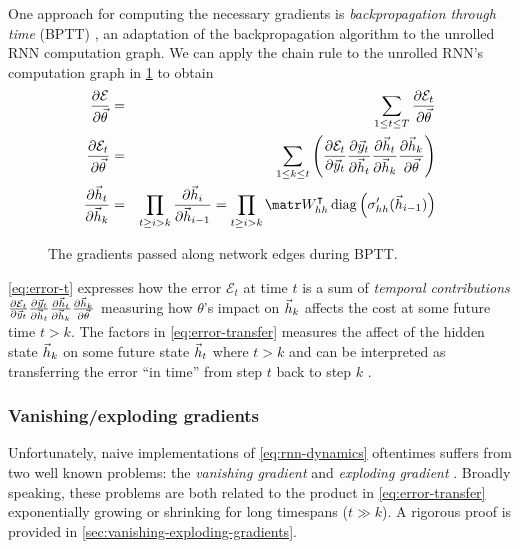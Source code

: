 One approach for computing the necessary gradients is \emph{backpropagation
through time} (BPTT) \citep{goller1996learning}, an adaptation of the backpropagation
algorithm \citep{linnainmaa1970representation,rumelhart1988learning} to the unrolled RNN computation
graph. We can apply the chain rule to the unrolled RNN's computation graph in
\cref{fig:rnn-bptt} to obtain
\begin{align}
    \frac{\pd \mathcal{E}}{\pd \vec{\theta}} &=& \sum_{1 \leq t \leq T} \frac{\pd \mathcal{E}_t}{\pd \vec{\theta}} \\
    \frac{\pd \mathcal{E}_t}{\pd \vec{\theta}} &=& \sum_{1 \leq k \leq t} \left(
        \frac{\pd \mathcal{E}_t}{\pd \y_t}
        \frac{\pd \y_t}{\pd \h_t}
        \frac{\pd \h_t}{\pd \h_k}
        \frac{\pd \h_k}{\pd \vec{\theta}}
    \right) \label{eq:error-t}\\
    \frac{\pd \h_t}{\pd \h_k} &=&
    \prod_{t \geq i > k} \frac{\pd \h_i}{\pd \h_{i-1}}
    = \prod_{t \geq i > k} \W_{hh}^\tp \diag \left( \sigma_{hh}'( \h_{i-1} ) \right)
    \label{eq:error-transfer}
\end{align}

\begin{figure}[tb]
    \centering
    
    \caption{The gradients passed along network edges during BPTT.}
    \label{fig:rnn-bptt}
\end{figure}

\cref{eq:error-t} expresses how the error $\mathcal{E}_t$ at time $t$ is a sum
of \emph{temporal contributions} $
\frac{\partial \mathcal{E}_t}{\partial \vec{y}_t}
\frac{\partial \vec{y}_t}{\partial \vec{h}_t}
\frac{\partial \vec{h}_t}{\partial \vec{h}_k}
\frac{\partial \vec{h}_k}{\partial \vec{\theta}}$
measuring how $\theta$'s impact on $\vec{h}_k$ affects the cost at some future
time $t > k$. The factors in \cref{eq:error-transfer} measures the affect
of the hidden state $\vec{h}_k$ on some future state $\vec{h}_t$ where $t > k$
and can be interpreted as transferring the error ``in time'' from step $t$ back
to step $k$ \citep{Pascanu2012}.

\subsubsection{Vanishing/exploding gradients}

Unfortunately, naive implementations of \cref{eq:rnn-dynamics} oftentimes
suffers from two well known problems: the \emph{vanishing gradient} and
\emph{exploding gradient} \citep{Bengio1994}. Broadly speaking, these problems
are both related to the product in \cref{eq:error-transfer} exponentially
growing or shrinking for long timespans (\ie $t \gg k$). A rigorous
proof is provided in \vref{sec:vanishing-exploding-gradients}.

